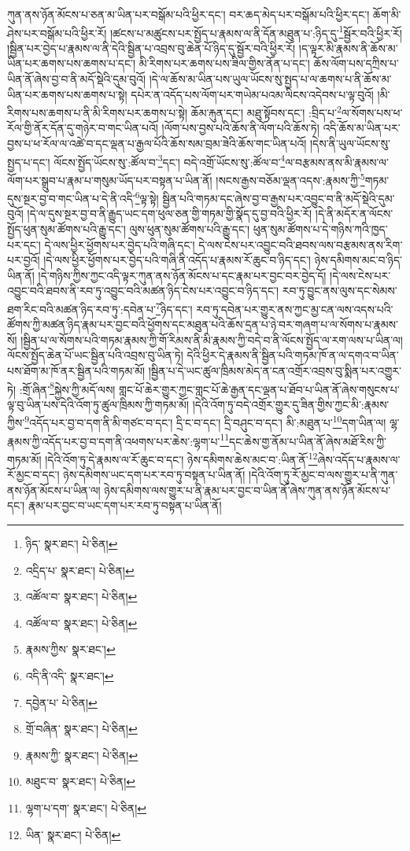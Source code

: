 ཀུན་ནས་ཉོན་མོངས་པ་ཅན་མ་ཡིན་པར་བསྒོམ་པའི་ཕྱིར་དང་། བར་ཆད་མེད་པར་བསྒོམ་པའི་ཕྱིར་དང་། ཆོག་མི་ཤེས་པར་བསྒོམ་པའི་ཕྱིར་རོ། །ཚངས་པ་མཚུངས་པར་སྤྱོད་པ་རྣམས་ལ་ནི་དོན་མཐུན་པ་:ཉིད་དུ་\footnote{ཉིད་  སྣར་ཐང་།  པེ་ཅིན། }སྦྱོར་བའི་ཕྱིར་རོ། །སྦྱིན་པར་བྱེད་པ་རྣམས་ལ་ནི་དེའི་སྦྱིན་པ་འབྲས་བུ་ཆེན་པོ་ཉིད་དུ་སྦྱོར་བའི་ཕྱིར་རོ། །ད་ལྟར་མི་རྣམས་ནི་ཆོས་མ་ཡིན་པར་ཆགས་པས་ཆགས་པ་དང་། མི་རིགས་པར་ཆགས་པས་ཟིལ་གྱིས་ནོན་པ་དང་། ཆོས་ལོག་པས་དཀྲིས་པ་ཡིན་ནོ་ཞེས་བྱ་བ་ནི་མདོ་སྡེའི་དུམ་བུའོ། །དེ་ལ་ཆོས་མ་ཡིན་པས་ཡུལ་ཡོངས་སུ་སྤྱད་པ་ལ་ཆགས་པ་ནི་ཆོས་མ་ཡིན་པར་ཆགས་པས་ཆགས་པ་སྟེ། དཔེར་ན་འདོད་པས་ལོག་པར་གཡེམ་པའམ་ལིངས་འདེབས་པ་ལྟ་བུའོ། །མི་རིགས་པས་ཆགས་པ་ནི་མི་རིགས་པར་ཆགས་པ་སྟེ། ཆོམ་རྐུན་དང་། མཐུ་སྟོབས་དང་། :བྲིད་པ་\footnote{འདྲིད་པ་  སྣར་ཐང་།  པེ་ཅིན། }ལ་སོགས་པས་ཕ་རོལ་གྱི་ནོར་དོན་དུ་གཉེར་བ་གང་ཡིན་པའོ། །ལོག་པས་བྱས་པའི་ཆོས་ནི་ལོག་པའི་ཆོས་ཏེ། འདི་ཆོས་མ་ཡིན་པར་བྱས་པ་ཕ་རོལ་ལ་འཚེ་བ་དང་ལྡན་པ་རྒྱལ་པོའི་ཆོས་སམ་བྲམ་ཟེའི་ཆོས་གང་ཡིན་པའོ། །དེས་ནི་ཡུལ་ཡོངས་སུ་སྤྱད་པ་དང་། ལོངས་སྤྱོད་ཡོངས་སུ་:ཚོལ་བ་\footnote{འཚོལ་བ་  སྣར་ཐང་།  པེ་ཅིན། }དང་། བདེ་འགྲོ་ཡོངས་སུ་:ཚོལ་བ་\footnote{འཚོལ་བ་  སྣར་ཐང་།  པེ་ཅིན། }ལ་བརྩམས་ནས་མི་རྣམས་ལ་ལོག་པར་སྒྲུབ་པ་རྣམ་པ་གསུམ་ཡོད་པར་བསྟན་པ་ཡིན་ནོ། །སངས་རྒྱས་བཅོམ་ལྡན་འདས་:རྣམས་ཀྱི་\footnote{རྣམས་ཀྱིས་  སྣར་ཐང་། }གཏམ་དུས་སྔར་བྱ་བ་གང་ཡིན་པ་དེ་ནི་འདི་\footnote{འདི་ནི་འདི་  སྣར་ཐང་། }ལྟ་སྟེ། སྦྱིན་པའི་གཏམ་དང་ཞེས་བྱ་བ་རྒྱས་པར་འབྱུང་བ་ནི་མདོ་སྡེའི་དུམ་བུའོ། །དེ་ལ་དུས་སྔར་བྱ་བ་ནི་རྒྱུད་ཡང་དག་ཕུལ་ཅན་གྱི་གཏམ་གྱི་སྣོད་དུ་བྱ་བའི་ཕྱིར་རོ། །དེ་ནི་མདོར་ན་ལོངས་སྤྱོད་ཕུན་སུམ་ཚོགས་པའི་རྒྱུ་དང་། ལུས་ཕུན་སུམ་ཚོགས་པའི་རྒྱུ་དང་། ཕུན་སུམ་ཚོགས་པ་དེ་གཉིས་ཀའི་ཁྱད་པར་དང་། དེ་ལས་ཕྱིར་ཕྱོགས་པར་བྱེད་པའི་གཞི་དང་། དེ་ལས་ངེས་པར་འབྱུང་བའི་ཐབས་ལས་བརྩམས་ནས་རིག་པར་བྱའོ། །དེ་ལས་ཕྱིར་ཕྱོགས་པར་བྱེད་པའི་གཞི་ནི་འདོད་པ་རྣམས་རོ་ཆུང་བ་ཉིད་དང་། ཉེས་དམིགས་མང་བ་ཉིད་ཡིན་ནོ། །དེ་གཉིས་ཀྱིས་ཀྱང་འདི་ལྟར་ཀུན་ནས་ཉོན་མོངས་པ་དང་རྣམ་པར་བྱང་བར་བྱེད་དོ། །དེ་ལས་ངེས་པར་འབྱུང་བའི་ཐབས་ནི་རབ་ཏུ་འབྱུང་བའི་མཚན་ཉིད་ངེས་པར་འབྱུང་བ་ཉིད་དང་། རབ་ཏུ་བྱུང་ནས་ལུས་དང་སེམས་ཐག་རིང་བའི་མཚན་ཉིད་རབ་ཏུ་:དབེན་པ་\footnote{དབྱེན་པ་  པེ་ཅིན། }ཉིད་དང་། རབ་ཏུ་དབེན་པར་གྱུར་ནས་ཀྱང་མྱ་ངན་ལས་འདས་པའི་ཚོགས་ཀྱི་མཚན་ཉིད་རྣམ་པར་བྱང་བའི་ཕྱོགས་དང་མཐུན་པའི་ཆོས་དྲན་པ་ཉེ་བར་གཞག་པ་ལ་སོགས་པ་རྣམས་སོ། །སྦྱིན་པ་ལ་སོགས་པའི་གཏམ་རྣམས་ཀྱི་གོ་རིམས་ནི་མི་རྣམས་ཀྱི་བདེ་བ་ནི་ལོངས་སྤྱོད་ལ་རག་ལས་པ་ཡིན་ལ། ལོངས་སྤྱོད་ཆེན་པོ་ཡང་སྦྱིན་པའི་འབྲས་བུ་ཡིན་ཏེ། དེའི་ཕྱིར་དེ་རྣམས་ནི་སྦྱིན་པའི་གཏམ་ཁོ་ན་ལ་དགའ་བ་ཡིན་པས་ཐོག་མ་ཁོ་ནར་སྦྱིན་པའི་གཏམ་མོ། །སྦྱིན་པ་དེ་ཡང་ཚུལ་ཁྲིམས་མེད་ན་ངན་འགྲོར་འབྲས་བུ་སྨིན་པར་འགྱུར་ཏེ། :གྲོ་ཞིན་\footnote{གྲོ་བཞིན་  སྣར་ཐང་།  པེ་ཅིན། }སྐྱེས་ཀྱི་མདོ་ལས། གླང་པོ་ཆེར་གྱུར་ཀྱང་གླང་པོ་ཆེ་རྒྱན་དང་ལྡན་པ་ཐོབ་པ་ཡིན་ནོ་ཞེས་གསུངས་པ་ལྟ་བུ་ཡིན་པས་དེའི་འོག་ཏུ་ཚུལ་ཁྲིམས་ཀྱི་གཏམ་མོ། །དེའི་འོག་ཏུ་བདེ་འགྲོར་གྱུར་དུ་ཟིན་གྱིས་ཀྱང་མི་:རྣམས་ཀྱིས་\footnote{རྣམས་ཀྱི་  སྣར་ཐང་།  པེ་ཅིན། }འདོད་པར་བྱ་བ་དག་ནི་མི་གཙང་བ་དང་། དྲི་ང་བ་དང་། དྲི་བཤུང་བ་དང་། མི་:མཐུན་པ་\footnote{མཐུང་བ་  སྣར་ཐང་།  པེ་ཅིན། }དག་ཡིན་ལ། ལྷ་རྣམས་ཀྱི་འདོད་པར་བྱ་བ་དག་ནི་འཕགས་པར་ཆེས་:ལྷག་པ་\footnote{ལྷག་པ་དག་  སྣར་ཐང་།  པེ་ཅིན། }དང་ཆེས་གྱ་ནོམ་པ་ཡིན་ནོ་ཞེས་མཐོ་རིས་ཀྱི་གཏམ་མོ། །དེའི་འོག་ཏུ་དེ་རྣམས་ལ་རོ་ཆུང་བ་དང་། ཉེས་དམིགས་ཆེས་མང་བ་:ཡིན་ནོ་\footnote{ཡིན་  སྣར་ཐང་།  པེ་ཅིན། }ཞེས་འདོད་པ་རྣམས་ལ་རོ་མྱང་བ་དང་། ཉེས་དམིགས་ཡང་དག་པར་རབ་ཏུ་བསྟན་པ་ཡིན་ནོ། །དེའི་འོག་ཏུ་རོ་མྱང་བ་ལས་གྱུར་པ་ནི་ཀུན་ནས་ཉོན་མོངས་པ་ཡིན་ལ། ཉེས་དམིགས་ལས་གྱུར་པ་ནི་རྣམ་པར་བྱང་བ་ཡིན་ནོ་ཞེས་ཀུན་ནས་ཉོན་མོངས་པ་དང་། རྣམ་པར་བྱང་བ་ཡང་དག་པར་རབ་ཏུ་བསྟན་པ་ཡིན་ནོ། 